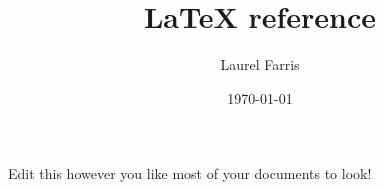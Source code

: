 \documentclass{article}
\title{LaTeX reference}
\author{Laurel Farris}
\date{\today}
\begin{document}
\maketitle

Edit this however you like most of your documents to look!
\end{document}
